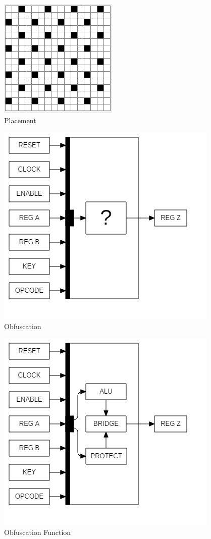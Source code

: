 \documentclass[10pt,journal,compsoc,letterpaper,final]{IEEEtran}
\begin{document}
\begin{figure}
	\centering
	\includegraphics[scale=1]{images/gatePlace}
	\caption{Placement}
	\label{place}
\end{figure}

\begin{figure}
	\centering
	\includegraphics[scale=0.6]{images/topAsk}
	\caption{Obfuscation}
	\label{topask}
\end{figure}

\begin{figure}
	\centering
	\includegraphics[scale=0.6]{images/top}
	\caption{Obfuscation Function}
	\label{top}
\end{figure}
\end{document}
